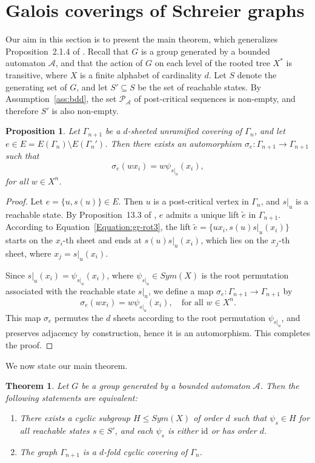 \documentclass{article}
\newtheorem{mythm}{Theorem}[section]
\newtheorem{mypro}{Proposition}[section]
\newcommand{\A}{\mathcal{A}}
\newcommand{\G}{\Gamma}
\newcommand{\idperm}{\mathrm{id}}
\newcommand{\pc}{\mathscr{P}_{\A}}
\begin{document}
\section{Galois coverings of Schreier graphs}\label{sec:galois}

Our aim in this section is to present the main theorem, which generalizes Proposition~2.1.4 of \cite{shaikh2016zeta}. Recall that $G$ is a group generated by a bounded automaton $\A$, and that the action of $G$ on each level of the rooted tree $X^*$ is transitive, where $X$ is a finite alphabet of cardinality $d$. Let $S$ denote the generating set of $G$, and let $S' \subseteq S$ be the set of reachable states. By Assumption~\ref{ass:bdd}, the set $\pc$ of post-critical sequences is non-empty, and therefore $S'$ is also non-empty.

\begin{mypro}\label{Pro:auto_exist}
Let $\G_{n+1}$ be a $d$-sheeted unramified covering of $\G_n$, and let $e \in E = E(\G_n) \setminus E(\G_n')$. Then there exists an automorphism $\sigma_e : \G_{n+1} \rightarrow \G_{n+1}$ such that 
\begin{equation}
    \sigma_e(wx_i) = w\psi_{s|_u}(x_i), \label{eqn:auto_non-tile}
\end{equation}
for all $w \in X^n$.
\end{mypro}
\begin{proof}
Let $e = \{u, s(u)\} \in E$. Then $u$ is a post-critical vertex in $\G_n$, and $s|_u$ is a reachable state. By Proposition~13.3 of \cite{terras2010zeta}, $e$ admits a unique lift $\tilde{e}$ in $\G_{n+1}$. According to Equation~\eqref{Equation:gr-rot3}, the lift $\tilde{e} = \{ux_i, s(u)s|_u(x_i)\}$ starts on the $x_i$-th sheet and ends at $s(u)s|_u(x_i)$, which lies on the $x_j$-th sheet, where $x_j = s|_u(x_i)$.

Since $s|_u(x_i) = \psi_{s|_u}(x_i)$, where $\psi_{s|_u} \in Sym(X)$ is the root permutation associated with the reachable state $s|_u$, we define a map $\sigma_e : \G_{n+1} \to \G_{n+1}$ by
$$\sigma_e(wx_i) = w\psi_{s|_u}(x_i), \quad \text{for all } w \in X^n.$$
This map $\sigma_e$ permutes the $d$ sheets according to the root permutation $\psi_{s|_u}$, and preserves adjacency by construction, hence it is an automorphism. This completes the proof.
\end{proof}

We now state our main theorem.

\begin{mythm}\label{Theorem:Galois}
Let $G$ be a group generated by a bounded automaton $\A$. Then the following statements are equivalent:
\begin{enumerate}
    \item \label{item:root} 
    There exists a cyclic subgroup $H\le Sym(X)$ of order $d$ such that $\psi_s\in H$ for all reachable states $s\in S'$, and each $\psi_s$ is either $\idperm$ or has order $d$.
    \item \label{item:frob} The graph $\G_{n+1}$ is a $d$-fold cyclic covering of $\G_n$.
\end{enumerate}
\end{mythm}
\end{document}
